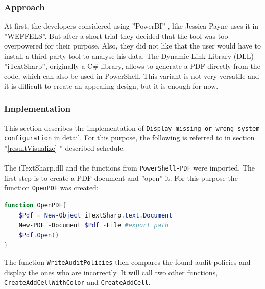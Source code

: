 \subsubsection{Approach}
At first, the developers considered using ''PowerBI'' \cite{PowerBI}, like Jessica Payne uses it in ''WEFFELS''. But after a short trial they decided that the tool was too overpowered for their purpose. Also, they did not like that the user would have to install a third-party tool to analyse his data. The Dynamic Link Library (DLL) ''iTextSharp'', originally a C\# library, allows to generate a PDF directly from the code, which can also be used in PowerShell. This variant is not very versatile and it is difficult to create an appealing design, but it is enough for now. 

\subsubsection{Implementation}
This section describes the implementation of \lstinline|Display missing or wrong system configuration| in detail. For this purpose, the following is referred to in section ''\ref{resultVisualize} '' described schedule. \\\\
The iTextSharp.dll and the functions from \lstinline|PowerShell-PDF| \cite{PowerShell-PDF} were imported. The first step is to create a PDF-document and ''open'' it. For this purpose the function \lstinline|OpenPDF| was created:
\begin{lstlisting}[caption=Function OpenPDF, language=PowerShell]
function OpenPDF{
    $Pdf = New-Object iTextSharp.text.Document 
    New-PDF -Document $Pdf -File #export path
    $Pdf.Open()
}
\end{lstlisting}
The function \lstinline|WriteAuditPolicies| then compares the found audit policies and display the ones who are incorrectly. It will call two other functions, \lstinline|CreateAddCellWithColor| and \lstinline|CreateAddCell|.
